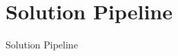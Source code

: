 \documentclass{beamer}
\def\implies{\Rightarrow}
\begin{document}
\section{Solution Pipeline}

\begin{frame}{Solution Pipeline}
\end{frame}

\end{document}
